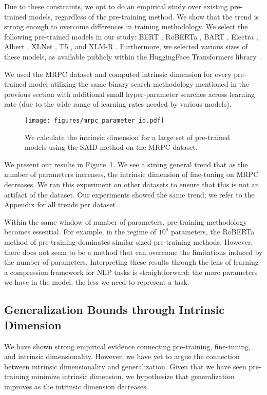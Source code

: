 \documentclass{article} \usepackage{iclr2020_conference,times}
\begin{document}
Due to these constraints, we opt to do an empirical study over existing pre-trained models, regardless of the pre-training method. We show that the trend is strong enough to overcome differences in training methodology. We select the following pre-trained models in our study: BERT \citep{BERT}, RoBERTa \citep{ROBERTA}, BART \citep{BART}, Electra \citep{ELECTRA}, Albert \citep{ALBERT}, XLNet \citep{XLNET}, T5 \citep{T5}, and XLM-R \citep{XLMR}. Furthermore, we selected various sizes of these models, as available publicly within the HuggingFace Transformers library~\citep{huggingface}.

We used the MRPC dataset and computed intrinsic dimension for every pre-trained model utilizing the same binary search methodology mentioned in the previous section with additional small hyper-parameter searches across learning rate (due to the wide range of learning rates needed by various models). 

\begin{figure}[h]
    \centering
    \texttt{[image: figures/mrpc\_parameter\_id.pdf]}
    \caption{We calculate the intrinsic dimension for a large set of pre-trained models using the SAID method on the MRPC dataset.}
    \label{fig:mrpc_parameter_id}
\end{figure}

We present our results in Figure~\ref{fig:mrpc_parameter_id}. We see a strong general trend that as the number of parameters increases, the intrinsic dimension of fine-tuning on MRPC decreases. We ran this experiment on other datasets to ensure that this is not an artifact of the dataset. Our experiments showed the same trend; we refer to the Appendix for all trends per dataset.

Within the same window of number of parameters, pre-training methodology becomes essential. For example, in the regime of $10^8$ parameters, the RoBERTa method of pre-training dominates similar sized pre-training methods. However, there does not seem to be a method that can overcome the limitations induced by the number of parameters. Interpreting these results through the lens of learning a compression framework for NLP tasks is straightforward; the more parameters we have in the model, the less we need to represent a task.


\subsection{Generalization Bounds through Intrinsic Dimension}
\label{sec:generalization}
We have shown strong empirical evidence connecting pre-training, fine-tuning, and intrinsic dimensionality. However, we have yet to argue the connection between intrinsic dimensionality and generalization. Given that we have seen pre-training minimize intrinsic dimension, we hypothesize that generalization improves as the intrinsic dimension decreases.
\end{document}
